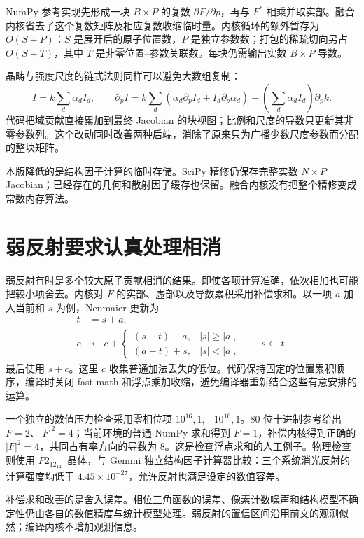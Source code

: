 NumPy 参考实现先形成一块 $B\times P$ 的复数 $\partial F/\partial p$，再与 $F^*$ 相乘并取实部。融合内核省去了这个复数矩阵及相应复数收缩临时量。内核循环的额外暂存为 $O(S+P)$：$S$ 是展开后的原子位置数，$P$ 是独立参数数；打包的稀疏切向另占 $O(S+T)$，其中 $T$ 是非零位置--参数关联数。每块仍需输出实数 $B\times P$ 导数。

晶畴与强度尺度的链式法则同样可以避免大数组复制：
\begin{equation}
 I=k\sum_d\alpha_d I_d,\qquad
 \partial_pI=k\sum_d\left(\alpha_d\partial_p I_d+
          I_d\partial_p\alpha_d\right)
        +\left(\sum_d\alpha_d I_d\right)\partial_pk .
\end{equation}
代码把域贡献直接累加到最终 Jacobian 的块视图；比例和尺度的导数只更新其非零参数列。这个改动同时改善两种后端，消除了原来只为广播少数尺度参数而分配的整块矩阵。

\begin{principle}
本版降低的是结构因子计算的临时存储。SciPy 精修仍保存完整实数 $N\times P$ Jacobian；已经存在的几何和散射因子缓存也保留。融合内核没有把整个精修变成常数内存算法。
\end{principle}

\section{弱反射要求认真处理相消}
弱反射有时是多个较大原子贡献相消的结果。即使各项计算准确，依次相加也可能把较小项舍去。内核对 $F$ 的实部、虚部以及导数累积采用补偿求和。以一项 $a$ 加入当前和 $s$ 为例，Neumaier 更新为
\begin{align}
 t&=s+a,\\
 c&\leftarrow c+
 \begin{cases}
 (s-t)+a,&|s|\ge |a|,\\
 (a-t)+s,&|s|<|a|,
 \end{cases}\qquad s\leftarrow t .
\end{align}
最后使用 $s+c$。这里 $c$ 收集普通加法丢失的低位。代码保持固定的位置累积顺序，编译时关闭 fast-math 和浮点乘加收缩，避免编译器重新结合这些有意安排的运算。

一个独立的数值压力检查采用零相位项
$10^{16},1,-10^{16},1$。80 位十进制参考给出 $F=2$、$|F|^2=4$；当前环境的普通 NumPy 求和得到 $F=1$，补偿内核得到正确的 $|F|^2=4$，共同占有率方向的导数为 $8$。这是检查浮点求和的人工例子。物理检查则使用 $P2_12_12_1$ 晶体，与 Gemmi 独立结构因子计算器比较：三个系统消光反射的计算强度均低于 $4.45\times10^{-27}$，允许反射也满足设定的数值容差。

补偿求和改善的是舍入误差。相位三角函数的误差、像素计数噪声和结构模型不确定性仍由各自的数值精度与统计模型处理。弱反射的置信区间沿用前文的观测似然；编译内核不增加观测信息。

